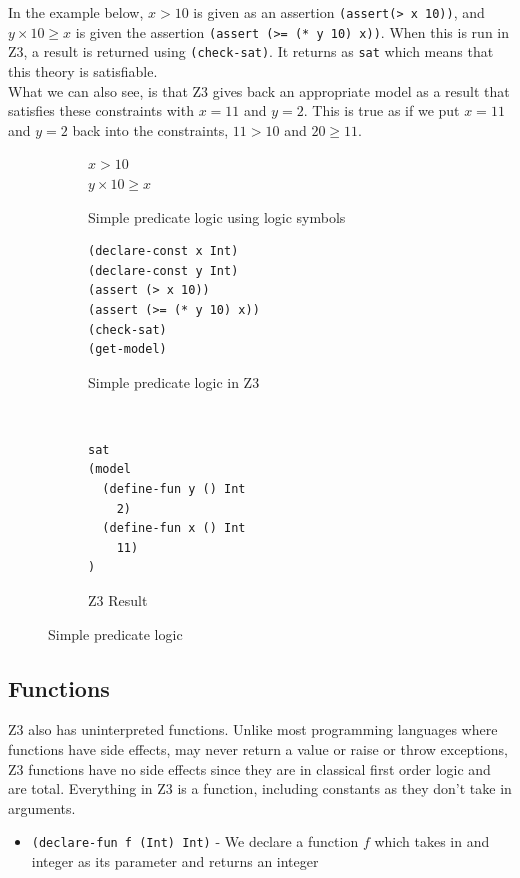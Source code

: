 \documentclass[a4paper]{report}
\begin{document}
In the example below, $x > 10$ is given as an assertion \texttt{(assert(> x 10))}, and $y \times 10 \geq x$ is given the assertion \texttt{(assert (>= (* y 10) x))}. When this is run in Z3, a result is returned using  \texttt{(check-sat)}. It returns as \texttt{sat} which means that this theory is satisfiable.\\ 
What we can also see, is that Z3 gives back an appropriate model as a result that satisfies these constraints with $x = 11$ and $y = 2$. This is true as if we put $x = 11$ and $y = 2$ back into the constraints, $11 > 10$ and $20 \geq 11$.
\begin{figure}[!htb]
\centering
\begin{subfigure}[b]{\textwidth}
\centering
$x > 10$ \\
$y \times 10 \geq x$
\caption{Simple predicate logic using logic symbols}
\label{fig:Simple predicate logic using logic symbols}
\end{subfigure}
\begin{subfigure}[b]{\textwidth}
\lstset{numbers=left, showspaces=false,
    showstringspaces=false, tabsize=2, breaklines=true,
    xleftmargin=5.0ex,
}
\lstset{basicstyle=\ttfamily}
\centering
\begin{lstlisting}[frame=single]
(declare-const x Int)
(declare-const y Int)
(assert (> x 10))
(assert (>= (* y 10) x))
(check-sat)
(get-model)
\end{lstlisting}
\caption{Simple predicate logic in Z3}
\label{fig:Simple predicate logic in Z3}
\end{subfigure}\\
\begin{subfigure}[b]{0.3\textwidth}
\begin{lstlisting}
sat
(model 
  (define-fun y () Int
    2)
  (define-fun x () Int
    11)
)
\end{lstlisting}
\caption{Z3 Result}
\label{fig:Z3 Result}
\end{subfigure}
\caption{Simple predicate logic}
\label{fig:Simple predicate logic}
\end{figure}

\subsection{Functions}
Z3 also has uninterpreted functions. Unlike most programming languages where functions have side effects, may never return a value or raise or throw exceptions, Z3 functions have no side effects since they are in classical first order logic and are total.
Everything in Z3 is a function, including constants as they don’t take in arguments.
\begin{itemize}
\item \texttt{(declare-fun f (Int) Int)} - We declare a function $f$ which takes in and integer as its parameter and returns an integer
\end{itemize}
\end{document}
